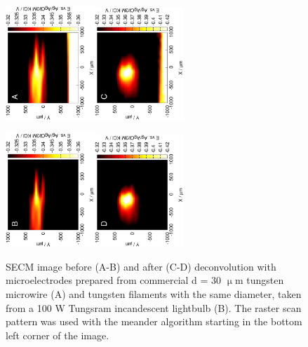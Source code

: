 \begin{figure}[h]
\centering
\includegraphics[trim = 10mm 30mm 0mm 10mm, clip, width=0.3\textwidth, angle=-90]{img/pH_2D_W/16020904.eps}\includegraphics[trim = 10mm 30mm 0mm 10mm, clip, width=0.3\textwidth, angle=-90]{img/pH_2D_W/16020904_deconvoluted.eps}%

\includegraphics[trim = 10mm 30mm 0mm 10mm, clip, width=0.3\textwidth, angle=-90]{img/pH_2D_W/16020905.eps}\includegraphics[trim = 10mm 30mm 0mm 10mm, clip, width=0.3\textwidth, angle=-90]{img/pH_2D_W/16020905_deconvoluted.eps}

\caption[SECM image before and after deconvolution.
Scans conducted with the tungsten microelectrodes.]{SECM image before (A-B) and after (C-D) deconvolution with microelectrodes prepared from commercial d = 30 $\upmu$m tungsten microwire (A) and tungsten filaments with the same diameter, taken from a 100 W Tungsram incandescent lightbulb (B).
The raster scan pattern was used with the meander algorithm starting in the bottom left corner of the image.}
\label{fig:deconvolution_tungsten}
\end{figure}

